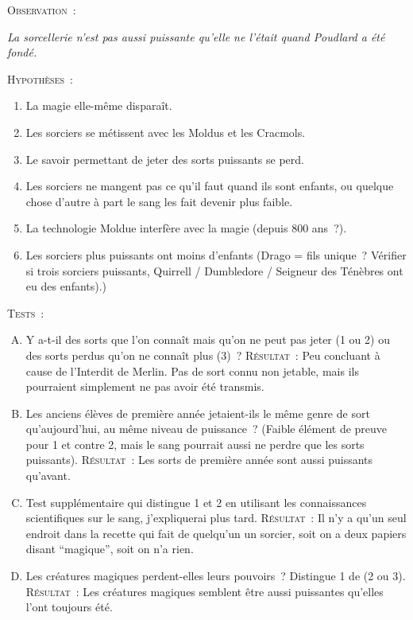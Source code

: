 \begin{centering}
\scshape Observation~:

\itshape La sorcellerie n'est pas aussi puissante qu'elle ne l'était quand Poudlard a été fondé.

\baselineskip

\scshape Hypothèses~:
\itshape
        \begin{enumerate}[1.]
        \item La magie elle-même disparaît.
        \item Les sorciers se métissent avec les Moldus et les Cracmols.
        \item Le savoir permettant de jeter des sorts puissants se perd.
        \item Les sorciers ne mangent pas ce qu'il faut quand ils sont enfants, ou quelque chose d'autre à part le sang les fait devenir plus faible.
        \item La technologie Moldue interfère avec la magie (depuis 800 ans~?).
        \item Les sorciers plus puissants ont moins d'enfants (Drago = fils unique~?
Vérifier si trois sorciers puissants, Quirrell / Dumbledore / Seigneur des Ténèbres ont eu des enfants).)
        \end{enumerate}

\baselineskip

\scshape Tests~:
\itshape
        \begin{enumerate}[A.]
        \item Y a-t-il des sorts que l'on connaît mais qu'on ne peut pas jeter (1 ou 2) ou des sorts perdus qu'on ne connaît plus (3)~?
{\scshape Résultat~:} Peu concluant à cause de l'Interdit de Merlin.
Pas de sort connu non jetable, mais ils pourraient simplement ne pas avoir été transmis.
        \item Les anciens élèves de première année jetaient-ils le même genre de sort qu'aujourd'hui, au même niveau de puissance~?
(Faible élément de preuve pour 1 et contre 2, mais le sang pourrait aussi ne perdre que les sorts puissants).
{\scshape Résultat~:} Les sorts de première année sont aussi puissants qu'avant.
        \item Test supplémentaire qui distingue 1 et 2 en utilisant les connaissances scientifiques sur le sang, j'expliquerai plus tard.
{\scshape Résultat~:} Il n'y a qu'un seul endroit dans la recette qui fait de quelqu'un un sorcier, soit on a deux papiers disant “magique”, soit on n'a rien.
        \item Les créatures magiques perdent-elles leurs pouvoirs~?
Distingue 1 de (2 ou 3).
{\scshape Résultat~:} Les créatures magiques semblent être aussi puissantes qu'elles l'ont toujours été.
        \end{enumerate}
\end{centering}

